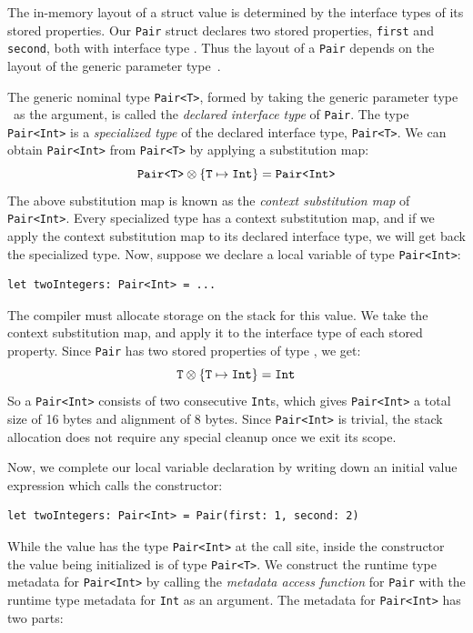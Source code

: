 \documentclass[../generics]{subfiles}
\begin{document}
The in-memory layout of a struct value is determined by the interface types of its stored properties. Our \texttt{Pair} struct declares two stored properties, \texttt{first} and \texttt{second}, both with interface type \tT. Thus the layout of a \texttt{Pair} depends on the layout of the generic parameter type~\tT.

The generic nominal type \texttt{Pair<T>}, formed by taking the generic parameter type \tT\ as the argument, is called the \emph{declared interface type} of \texttt{Pair}. The type \texttt{Pair<Int>} is a \emph{specialized type} of the declared interface type, \texttt{Pair<T>}. We can obtain \texttt{Pair<Int>} from \texttt{Pair<T>} by applying a substitution map:
\[\texttt{Pair<T>} \otimes \{\texttt{T} \mapsto \texttt{Int}\} = \texttt{Pair<Int>}\]
The above substitution map is known as the \emph{context substitution map} of \texttt{Pair<Int>}. Every specialized type has a context substitution map, and if we apply the context substitution map to its declared interface type, we will get back the specialized type. Now, suppose we declare a local variable of type \texttt{Pair<Int>}:
\begin{Verbatim}
let twoIntegers: Pair<Int> = ...
\end{Verbatim}
The compiler must allocate storage on the stack for this value. We take the context substitution map, and apply it to the interface type of each stored property. Since \texttt{Pair} has two stored properties of type \tT, we get:
\[\texttt{T} \otimes \{\texttt{T} \mapsto \texttt{Int}\} = \texttt{Int}\]
So a \texttt{Pair<Int>} consists of two consecutive \texttt{Int}s, which gives \texttt{Pair<Int>} a total size of 16 bytes and alignment of 8 bytes. Since \texttt{Pair<Int>} is trivial, the stack allocation does not require any special cleanup once we exit its scope.

Now, we complete our local variable declaration by writing down an initial value expression which calls the constructor:
\begin{Verbatim}
let twoIntegers: Pair<Int> = Pair(first: 1, second: 2)
\end{Verbatim}
While the value has the type \texttt{Pair<Int>} at the call site, inside the constructor the value being initialized is of type \texttt{Pair<T>}. We construct the runtime type metadata for \texttt{Pair<Int>} by calling the \emph{metadata access function} for \texttt{Pair} with the runtime type metadata for \texttt{Int} as an argument. The metadata for \texttt{Pair<Int>} has two parts:
\end{document}

